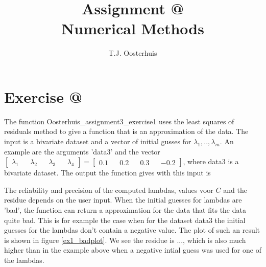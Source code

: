 \documentclass[12pt]{article}
\makeatletter
\newcommand*{\rom}[1]{\expandafter\@slowromancap\romannumeral #1@}
\makeatother
\begin{document}
 
 
\title{Assignment \rom{3} \\
\large Numerical Methods} 
\author{T.J. Oosterhuis}
\maketitle
%
\section*{Exercise \rom{1}}
The function Oosterhuis\_assignment3\_exercise1 uses the least squares of residuals method to give a function that is an approximation of the data. The input is a bivariate dataset and a vector of initial gusses for $\lambda_1,..,\lambda_m.$ An example are the arguments 'data3' and the vector $\begin{bmatrix} \lambda_1 && \lambda_2 && \lambda_3 && \lambda_4 \end{bmatrix} =  \begin{bmatrix} 0.1 && 0.2 && 0.3 && -0.2 \end{bmatrix}$, where data3 is a bivariate dataset. The output the function gives with this input is %

The reliability and precision of the computed lambdas, values voor $C$ and the residue depends on the user input. When the initial guesses for lambdas are 'bad', the function can return a approximation for the data that fits the data quite bad. This is for example the case when for the dataset data3 the initial guesses for the lambdas don't contain a negative value. The plot of such an result is shown in figure \ref{ex1_badplot}. We see the residue is ..., which is also much higher than in the example above when a negative intial guess was used for one of the lambdas.
\end{document}
